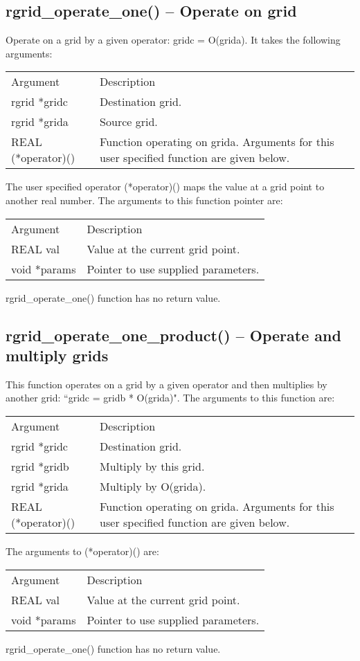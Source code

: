 \documentclass[12pt,letterpaper]{report}
\begin{document}
\subsection{rgrid\_operate\_one() -- Operate on grid}

Operate on a grid by a given operator: gridc = O(grida). It takes the following arguments:
\begin{longtable}{p{} p{}}
Argument & Description\\
\cline{1-2}
rgrid *gridc & Destination grid.\\
rgrid *grida & Source grid.\\
REAL (*operator)() & Function operating on grida. Arguments for this user specified function are given below.\\
\end{longtable}
\noindent
The user specified operator (*operator)() maps the value at a grid point to another real number. The arguments to this function pointer are:
\begin{longtable}{p{} p{}}
Argument & Description\\
\cline{1-2}
REAL val & Value at the current grid point.\\
void *params & Pointer to use supplied parameters.\\
\end{longtable}
\noindent
rgrid\_operate\_one() function has no return value.

\subsection{rgrid\_operate\_one\_product() -- Operate and multiply grids}

This function  operates on a grid by a given operator and then multiplies by another grid: ``gridc = gridb * O(grida)". The arguments to this function are:
\begin{longtable}{p{} p{}}
Argument & Description\\
\cline{1-2}
rgrid *gridc & Destination grid.\\
rgrid *gridb & Multiply by this grid.\\
rgrid *grida & Multiply by O(grida).\\
REAL (*operator)() & Function operating on grida. Arguments for this user specified function are given below.\\
\end{longtable}
The arguments to (*operator)() are:
\begin{longtable}{p{} p{}}
Argument & Description\\
\cline{1-2}
REAL val & Value at the current grid point.\\
void *params & Pointer to use supplied parameters.\\
\end{longtable}
\noindent
rgrid\_operate\_one() function has no return value.
\end{document}
